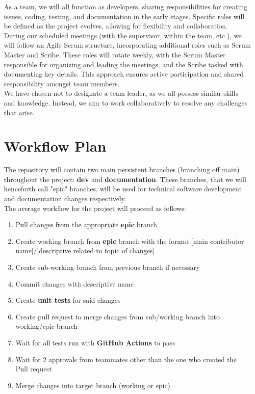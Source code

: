 \documentclass{article}
\begin{document}
\hspace{\parindent}As a team, we will all function as developers, sharing responsibilities
for creating issues, coding, testing, and documentation in the early stages. Specific roles
will be defined as the project evolves, allowing for flexibility and collaboration. \\

During our scheduled meetings (with the supervisor, within the team, etc.), we will follow
an Agile Scrum structure, incorporating additional roles such as Scrum Master and Scribe.
These roles will rotate weekly, with the Scrum Master responsible for organizing and leading
the meetings, and the Scribe tasked with documenting key details. This approach ensures active
participation and shared responsibility amongst team members. \\

We have chosen not to designate a team leader, as we all possess similar skills and knowledge.
Instead, we aim to work collaboratively to resolve any challenges that arise.

\section{Workflow Plan}

The repository will contain two main persistent branches (branching off main) throughout the project:
\textbf{dev} and \textbf{documentation}. These branches, that we will henceforth call "epic" branches, will be used for technical
software development and documentation changes respectively. \\

The average workflow for the project will proceed as follows:
\begin{enumerate}
  \item Pull changes from the appropriate \textbf{epic} branch
  \item Create working branch from \textbf{epic} branch with the format [main contributor name]/[descriptive related to topic of changes]
  \item Create sub-working-branch from previous branch if necessary
  \item Commit changes with descriptive name
  \item Create \textbf{unit tests} for said changes
  \item Create pull request to merge changes from sub/working branch into working/epic branch
  \item Wait for all tests run with \textbf{GitHub Actions} to pass
  \item Wait for 2 approvals from teammates other than the one who created the Pull request
  \item Merge changes into target branch (working or epic)
\end{enumerate}
\end{document}
